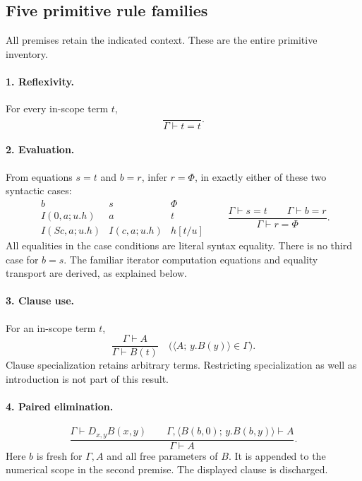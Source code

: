 \documentclass[11pt,letterpaper]{article}
\theoremstyle{definition}
\theoremstyle{remark}
\newcommand{\cl}[2]{\langle #1;\,#2\rangle}
\begin{document}
\subsection{Five primitive rule families}

All premises retain the indicated context. These are the entire
primitive inventory.

\paragraph{1. Reflexivity.}
For every in-scope term $t$,
\[
 \frac{}{\Gamma\vdash t=t}.\tag{Refl}
\]

\paragraph{2. Evaluation.}
From equations $s=t$ and $b=r$, infer $r=\Phi$, in exactly either of
these two syntactic cases:
\[
\begin{array}{c|c|c}
 b&s&\Phi\\\hline
 I(0,a;u.h)&a&t\\
 I(Sc,a;u.h)&I(c,a;u.h)&h[t/u]
\end{array}
\qquad
 \frac{\Gamma\vdash s=t\qquad\Gamma\vdash b=r}
      {\Gamma\vdash r=\Phi}.
\tag{Eval}
\]
All equalities in the case conditions are literal syntax equality. There
is no third case for $b=s$. The familiar iterator computation equations
and equality transport are derived, as explained below.

\paragraph{3. Clause use.}
For an in-scope term $t$,
\[
 \frac{\Gamma\vdash A}{\Gamma\vdash B(t)}
 \quad\bigl(\cl{A}{y.B(y)}\in\Gamma\bigr).
 \tag{Use}
\]
Clause specialization retains arbitrary terms. Restricting specialization
as well as introduction is not part of this result.

\paragraph{4. Paired elimination.}
\[
 \frac{\Gamma\vdash D_{x,y}B(x,y)\qquad
 \Gamma,\cl{B(b,0)}{y.B(b,y)}\vdash A}
 {\Gamma\vdash A}.
 \tag{Elim}
\]
Here $b$ is fresh for $\Gamma,A$ and all free parameters of $B$.
It is appended to the numerical scope in the second premise. The
displayed clause is discharged.
\end{document}
